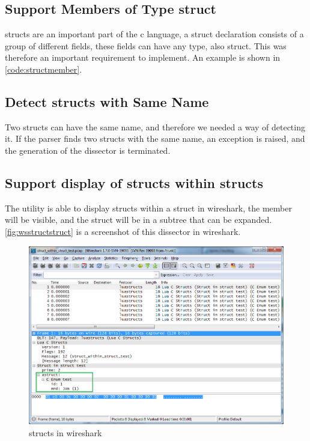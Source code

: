 

\subsection{Support Members of Type \Gls{struct}}
\Glspl{struct} are an important part of the \Gls{c} language, a \gls{struct} declaration consists 
of a group of different fields, these fields can have any type, also \gls{struct}. 
This was therefore an important requirement to implement. An example is shown 
in \autoref{code:structmember}.



\subsection{Detect \Glspl{struct} with Same Name}
Two \glspl{struct} can have the same name, and therefore we needed a way of detecting it. 
If the \gls{parser} finds two \glspl{struct} with the same name, an exception is 
raised, and the generation of the \gls{dissector} is terminated.

\subsection{Support display of \glspl{struct} within \glspl{struct}}
The \gls{utility} is able to display \glspl{struct} within a \gls{struct} in \Gls{wireshark}, the 
\gls{member} will be visible, and the \gls{struct} will be in a subtree that can be 
expanded. \autoref{fig:wsstructstruct} is a screenshot of this \gls{dissector} in 
\Gls{wireshark}.

\begin{figure}[ht]
	\center
	\includegraphics[width=\textwidth]{./sprints/img/wireshark_structwithstruct}
	\caption{\Glspl{struct} in \Gls{wireshark}\label{fig:wsstructstruct}}
\end{figure}

